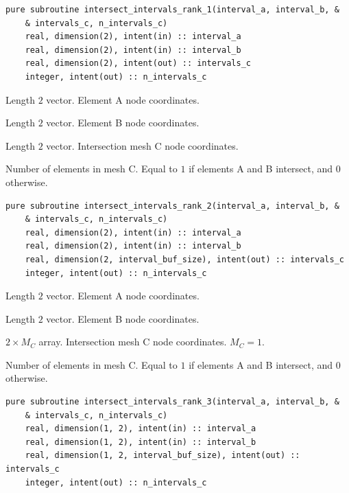 \documentclass{article}
\begin{document}
\begin{lstlisting}[language=FORTRAN]   
  pure subroutine intersect_intervals_rank_1(interval_a, interval_b, &
    & intervals_c, n_intervals_c)
    real, dimension(2), intent(in) :: interval_a
    real, dimension(2), intent(in) :: interval_b
    real, dimension(2), intent(out) :: intervals_c
    integer, intent(out) :: n_intervals_c
\end{lstlisting} 

\begin{description}[font=\ttfamily\bfseries,leftmargin=2.2\parindent,labelindent=1.7\parindent,noitemsep]
  \item[interval\_a] Length $2$ vector. Element A node coordinates.
  \item[interval\_b] Length $2$ vector. Element B node coordinates.
  \item[interval\_c] Length $2$ vector. Intersection mesh C node coordinates.
  \item[n\_intervals\_c] Number of elements in mesh C. Equal to $1$ if elements
    A and B intersect, and $0$ otherwise.
\end{description}
  
\begin{lstlisting}[language=FORTRAN]   
  pure subroutine intersect_intervals_rank_2(interval_a, interval_b, &
    & intervals_c, n_intervals_c)
    real, dimension(2), intent(in) :: interval_a
    real, dimension(2), intent(in) :: interval_b
    real, dimension(2, interval_buf_size), intent(out) :: intervals_c
    integer, intent(out) :: n_intervals_c
\end{lstlisting} 

\begin{description}[font=\ttfamily\bfseries,leftmargin=2.2\parindent,labelindent=1.7\parindent,noitemsep]
  \item[interval\_a] Length $2$ vector. Element A node coordinates.
  \item[interval\_b] Length $2$ vector. Element B node coordinates.
  \item[interval\_c] $2 \times M_C$ array. Intersection mesh C node coordinates.
     $M_C = 1$.
  \item[n\_intervals\_c] Number of elements in mesh C. Equal to $1$ if elements
    A and B intersect, and $0$ otherwise.
\end{description}
  
\begin{lstlisting}[language=FORTRAN]  
  pure subroutine intersect_intervals_rank_3(interval_a, interval_b, &
    & intervals_c, n_intervals_c)
    real, dimension(1, 2), intent(in) :: interval_a
    real, dimension(1, 2), intent(in) :: interval_b
    real, dimension(1, 2, interval_buf_size), intent(out) :: intervals_c
    integer, intent(out) :: n_intervals_c
\end{lstlisting} 
\end{document}
